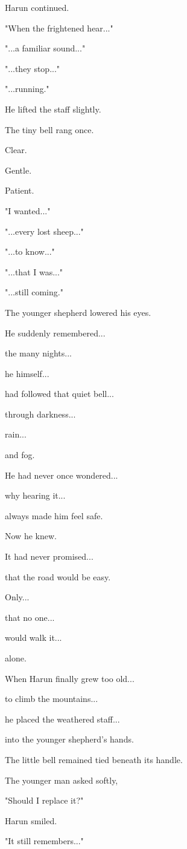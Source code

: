 \documentclass[12pt,openany]{book}
\begin{document}
Harun continued.

"When the frightened hear..."

"...a familiar sound..."

"...they stop..."

"...running."

He lifted the staff slightly.

The tiny bell rang once.

Clear.

Gentle.

Patient.

"I wanted..."

"...every lost sheep..."

"...to know..."

"...that I was..."

"...still coming."

The younger shepherd lowered his eyes.

He suddenly remembered...

the many nights...

he himself...

had followed that quiet bell...

through darkness...

rain...

and fog.

He had never once wondered...

why hearing it...

always made him feel safe.

Now he knew.

It had never promised...

that the road would be easy.

Only...

that no one...

would walk it...

alone.

When Harun finally grew too old...

to climb the mountains...

he placed the weathered staff...

into the younger shepherd's hands.

The little bell remained tied beneath its handle.

The younger man asked softly,

"Should I replace it?"

Harun smiled.

"It still remembers..."
\end{document}
